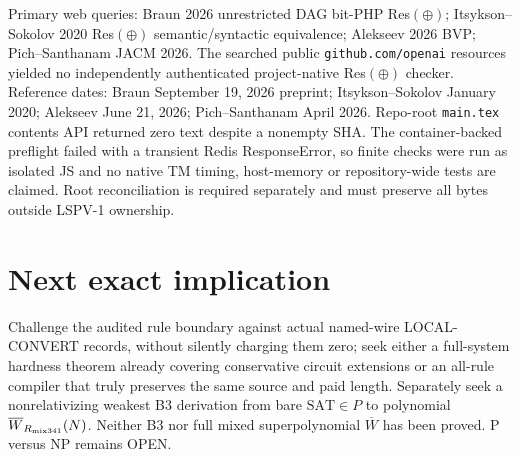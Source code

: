 \documentclass[11pt]{article}
\begin{document}
Primary web queries: Braun 2026 unrestricted DAG bit-PHP Res$(\oplus)$; Itsykson--Sokolov 2020 Res$(\oplus)$ semantic/syntactic equivalence; Alekseev 2026 BVP; Pich--Santhanam JACM 2026. The searched public \texttt{github.com/openai} resources yielded no independently authenticated project-native Res$(\oplus)$ checker. Reference dates: Braun September 19, 2026 preprint; Itsykson--Sokolov January 2020; Alekseev June 21, 2026; Pich--Santhanam April 2026. Repo-root \texttt{main.tex} contents API returned zero text despite a nonempty SHA. The container-backed preflight failed with a transient Redis ResponseError, so finite checks were run as isolated JS and no native TM timing, host-memory or repository-wide tests are claimed. Root reconciliation is required separately and must preserve all bytes outside LSPV-1 ownership.

\section*{Next exact implication}
Challenge the audited rule boundary against actual named-wire LOCAL-CONVERT records, without silently charging them zero; seek either a full-system hardness theorem already covering conservative circuit extensions or an all-rule compiler that truly preserves the same source and paid length. Separately seek a nonrelativizing weakest B3 derivation from bare $\mathrm{SAT}\in P$ to polynomial $\overline W_{R_{\rm mix341}}(N)$. Neither B3 nor full mixed superpolynomial $\overline W$ has been proved. P versus NP remains OPEN.


\end{document}
